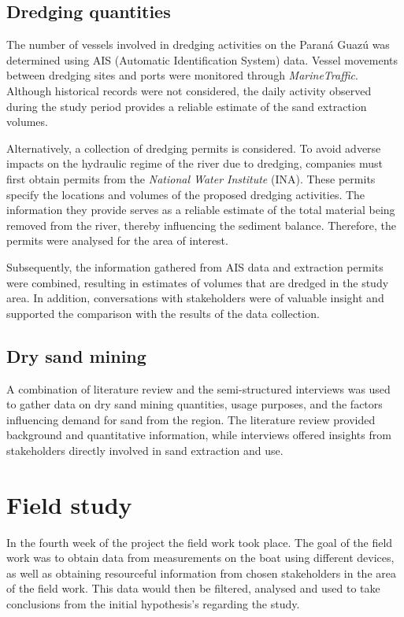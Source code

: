 \subsection{Dredging quantities}
The number of vessels involved in dredging activities on the Paraná Guazú was determined using AIS (Automatic Identification System) data. Vessel movements between dredging sites and ports were monitored through \textit{MarineTraffic}. Although historical records were not considered, the daily activity observed during the study period provides a reliable estimate of the sand extraction volumes. 

Alternatively, a collection of dredging permits is considered. To avoid adverse impacts on the hydraulic regime of the river due to dredging, companies must first obtain permits from the \textit{National Water Institute }(INA). These permits specify the locations and volumes of the proposed dredging activities. The information they provide serves as a reliable estimate of the total material being removed from the river, thereby influencing the sediment balance. Therefore, the permits were analysed for the area of interest.

Subsequently, the information gathered from AIS data and extraction permits were combined, resulting in estimates of volumes that are dredged in the study area. In addition, conversations with stakeholders were of valuable insight and supported the comparison with the results of the data collection. 

\subsection{Dry sand mining}
A combination of literature review and the semi-structured interviews was used to gather data on dry sand mining quantities, usage purposes, and the factors influencing demand for sand from the region. The literature review provided background and quantitative information, while interviews offered insights from stakeholders directly involved in sand extraction and use.

\section{Field study}
\label{sec:field study}
In the fourth week of the project the field work took place. The goal of the field work was to obtain data from measurements on the boat using different devices, as well as obtaining resourceful information from chosen stakeholders in the area of the field work. This data would then be filtered, analysed and used to take conclusions from the initial hypothesis's regarding the study.

